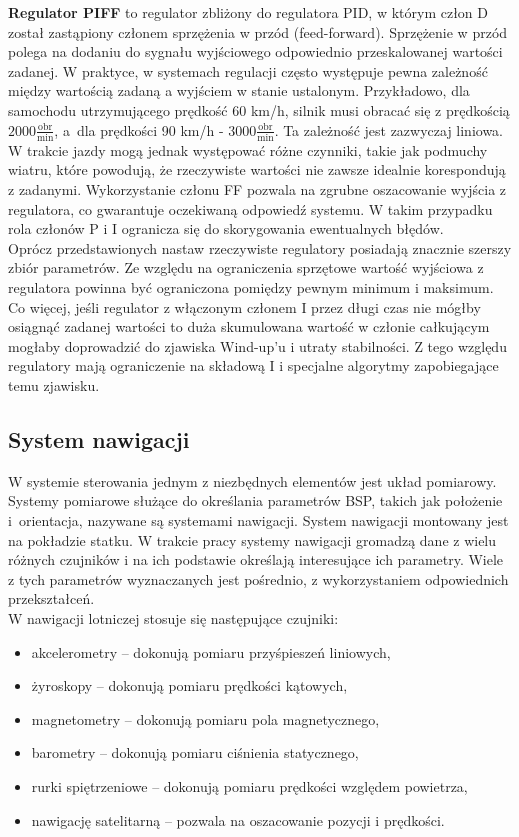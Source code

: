 \textbf{Regulator PIFF} to regulator zbliżony do regulatora PID, w którym człon D został zastąpiony członem sprzężenia w przód (feed-forward). Sprzężenie w przód polega na dodaniu do sygnału wyjściowego odpowiednio przeskalowanej wartości zadanej. W praktyce, w systemach regulacji często występuje pewna zależność między wartością zadaną a wyjściem w stanie ustalonym. Przykładowo, dla samochodu utrzymującego prędkość 60 km/h, silnik musi obracać się z prędkością $2000 \frac{\text{obr}}{\text{min}}$, a~dla prędkości 90 km/h - $3000 \frac{\text{obr}}{\text{min}}$. Ta zależność jest zazwyczaj liniowa. W trakcie jazdy mogą jednak występować różne czynniki, takie jak podmuchy wiatru, które powodują, że rzeczywiste wartości nie zawsze idealnie korespondują z zadanymi. Wykorzystanie członu FF pozwala na zgrubne oszacowanie wyjścia z regulatora, co gwarantuje oczekiwaną odpowiedź systemu. W takim przypadku rola członów P i I ogranicza się do skorygowania ewentualnych błędów. \\

Oprócz przedstawionych nastaw rzeczywiste regulatory posiadają znacznie szerszy zbiór parametrów. Ze względu na ograniczenia sprzętowe wartość wyjściowa z regulatora powinna być ograniczona pomiędzy pewnym minimum i maksimum. Co więcej, jeśli regulator z włączonym członem I przez długi czas nie mógłby osiągnąć zadanej wartości to duża skumulowana wartość w członie całkującym mogłaby doprowadzić do zjawiska Wind-up'u i utraty stabilności. Z tego względu regulatory mają ograniczenie na składową I i specjalne algorytmy zapobiegające temu zjawisku. 

\subsection{System nawigacji}

W systemie sterowania jednym z niezbędnych elementów jest układ pomiarowy. Systemy pomiarowe służące do określania parametrów BSP, takich jak położenie i~orientacja, nazywane są systemami nawigacji. System nawigacji montowany jest na pokładzie statku. W trakcie pracy systemy nawigacji gromadzą dane z wielu różnych czujników i na ich podstawie określają interesujące ich parametry. Wiele z tych parametrów wyznaczanych jest pośrednio, z wykorzystaniem odpowiednich przekształceń.\\

W nawigacji lotniczej stosuje się następujące czujniki:
\begin{itemize}
  \item akcelerometry -- dokonują pomiaru przyśpieszeń liniowych,
  \item żyroskopy -- dokonują pomiaru prędkości kątowych,
  \item magnetometry -- dokonują pomiaru pola magnetycznego,
  \item barometry -- dokonują pomiaru ciśnienia statycznego,
  \item rurki spiętrzeniowe -- dokonują pomiaru prędkości względem powietrza,
  \item nawigację satelitarną -- pozwala na oszacowanie pozycji i prędkości.
\end{itemize}


